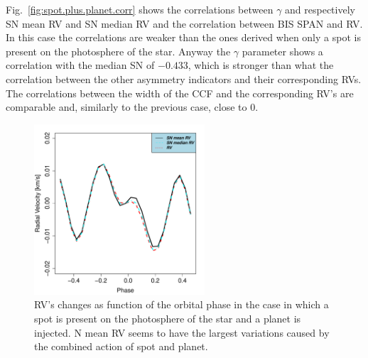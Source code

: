 \documentclass[11pt, oneside]{article}
\begin{document}
Fig.~\ref{fig:spot.plus.planet.corr} shows the correlations between $\gamma$ and respectively SN mean RV and SN median RV and the correlation between BIS SPAN and RV. In this case the correlations are weaker than the ones derived when only a spot is present on the photosphere of the star. Anyway the $\gamma$ parameter shows a correlation with the median SN of $-0.433$, which is stronger than what the correlation between the other asymmetry indicators and their corresponding RVs. The correlations between the width of the CCF and the corresponding RV's are comparable and, similarly to the previous case, close to $0$.

\begin{figure}[htbp]
   \centering
\includegraphics[height = 2.5in]{RV_comparison_SPOT_PLANET.pdf} 
 \caption{RV's changes as function of the orbital phase in the case in which a spot is present on the photosphere of the star and a planet is injected. N mean RV seems to have the largest variations caused by the combined action of spot and planet.}
    \label{fig:spot.plus.planet}
\end{figure}
\end{document}
